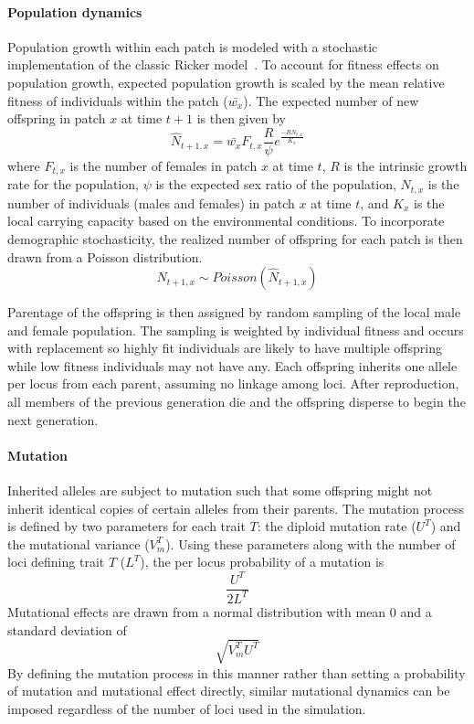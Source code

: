 \documentclass[11pt, oneside]{article}
\begin{document}
\paragraph{Population dynamics}
Population growth within each patch is modeled with a stochastic implementation of the classic Ricker model~\citep{ricker1954stock, melbourne2008extinction}. To account for fitness effects on population growth, expected population growth is scaled by the mean relative fitness of individuals within the patch ($\bar{w_{x}}$). The expected number of new offspring in patch $x$ at time $t+1$ is then given by
\begin{equation}
\hat{N}_{t+1,x}=\bar{w_{x}}F_{t,x}\frac{R}{\psi}e^{\frac{-RN_{t,x}}{K_{x}}}
\end{equation}
where $F_{t,x}$ is the number of females in patch $x$ at time $t$, $R$ is the intrinsic growth rate for the population, $\psi$ is the expected sex ratio of the population, $N_{t,x}$ is the number of individuals (males and females) in patch $x$ at time $t$, and $K_{x}$ is the local carrying capacity based on the environmental conditions. To incorporate demographic stochasticity, the realized number of offspring for each patch is then drawn from a Poisson distribution.
\begin{equation}
N_{t+1,x}\sim Poisson(\hat{N}_{t+1,x})
\end{equation}

Parentage of the offspring is then assigned by random sampling of the local male and female population. The sampling is weighted by individual fitness and occurs with replacement so highly fit individuals are likely to have multiple offspring while low fitness individuals may not have any. Each offspring inherits one allele per locus from each parent, assuming no linkage among loci. After reproduction, all members of the previous generation die and the offspring disperse to begin the next generation.

\paragraph{Mutation}
Inherited alleles are subject to mutation such that some offspring might not inherit identical copies of certain alleles from their parents. The mutation process is defined by two parameters for each trait $T$: the diploid mutation rate ($U^{T}$) and the mutational variance ($V_{m}^{T}$). Using these parameters along with the number of loci defining trait $T$ ($L^{T}$), the per locus probability of a mutation is
\begin{equation}
\frac{U^{T}}{2L^{T}}
\end{equation}
Mutational effects are drawn from a normal distribution with mean $0$ and a standard deviation of
\begin{equation}
\sqrt{V_{m}^{T}U^{T}}
\end{equation}
By defining the mutation process in this manner rather than setting a probability of mutation and mutational effect directly, similar mutational dynamics can be imposed regardless of the number of loci used in the simulation.
\end{document}
